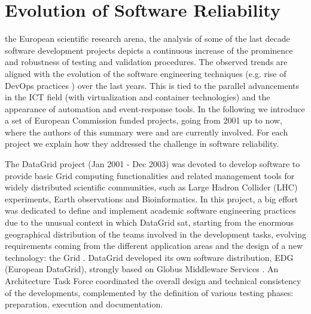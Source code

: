 \documentclass[journal]{IEEEtran}
\begin{document}
\section{Evolution of Software Reliability}
%
%
%
%
 the European scientific research arena, the analysis of some of the last decade software development projects depicts a continuous increase of the prominence and robustness of testing and validation procedures. The observed trends are aligned with the evolution of the software engineering techniques (e.g. rise of DevOps practices \cite{devops}) over the last years. This is tied to the parallel advancements in the ICT field (with virtualization and container technologies) and the appearance of automation and event-response tools. In the following we introduce a set of European Commission funded projects, going from 2001 up to now, where the authors of this summary were and are currently involved. For each project we explain how they addressed the challenge in software reliability.

The DataGrid \cite{cordis:datagrid} project (Jan 2001 - Dec 2003) was devoted to develop software to provide basic Grid computing functionalities and related management tools for widely distributed scientific communities, such as Large Hadron Collider (LHC) experiments, Earth observations and Bioinformatics. In this project, a big effort was dedicated to define and implement academic software engineering practices due to the unusual context in which DataGrid sat, starting from the enormous geographical distribution of the teams involved in the development tasks, evolving requirements coming from the different application areas and the design of a new technology: the Grid \cite{datagrid}. DataGrid developed its own software distribution, EDG (European DataGrid), strongly based on Globus Middleware Services \cite{globus}. An Architecture Task Force coordinated the overall design and technical consistency of the developments, complemented by the definition of various testing phases: preparation, execution and documentation.
\end{document}
